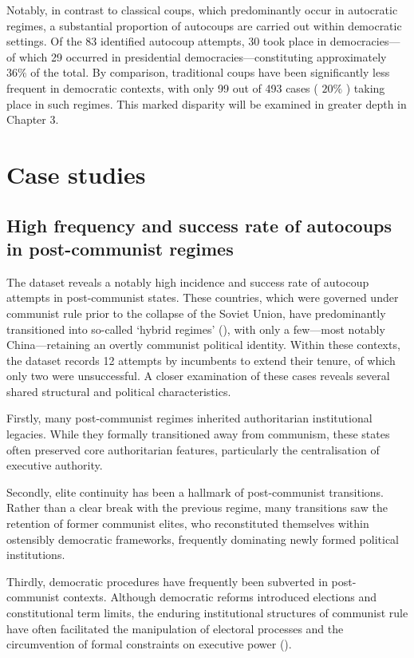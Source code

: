 \documentclass[
  12pt,
]{report}
\begin{document}
Notably, in contrast to classical coups, which predominantly occur in
autocratic regimes, a substantial proportion of autocoups are carried
out within democratic settings. Of the 83 identified autocoup attempts,
30 took place in democracies---of which 29 occurred in presidential
democracies---constituting approximately \(36\%\) of the total. By
comparison, traditional coups have been significantly less frequent in
democratic contexts, with only 99 out of 493 cases ( \(20\%\) ) taking
place in such regimes. This marked disparity will be examined in greater
depth in Chapter 3.

\section{Case studies}\label{case-studies}

\subsection{High frequency and success rate of autocoups in
post-communist
regimes}\label{high-frequency-and-success-rate-of-autocoups-in-post-communist-regimes}

The dataset reveals a notably high incidence and success rate of
autocoup attempts in post-communist states. These countries, which were
governed under communist rule prior to the collapse of the Soviet Union,
have predominantly transitioned into so-called `hybrid regimes'
(), with only a
few---most notably China---retaining an overtly communist political
identity. Within these contexts, the dataset records 12 attempts by
incumbents to extend their tenure, of which only two were unsuccessful.
A closer examination of these cases reveals several shared structural
and political characteristics.

Firstly, many post-communist regimes inherited authoritarian
institutional legacies. While they formally transitioned away from
communism, these states often preserved core authoritarian features,
particularly the centralisation of executive authority.

Secondly, elite continuity has been a hallmark of post-communist
transitions. Rather than a clear break with the previous regime, many
transitions saw the retention of former communist elites, who
reconstituted themselves within ostensibly democratic frameworks,
frequently dominating newly formed political institutions.

Thirdly, democratic procedures have frequently been subverted in
post-communist contexts. Although democratic reforms introduced
elections and constitutional term limits, the enduring institutional
structures of communist rule have often facilitated the manipulation of
electoral processes and the circumvention of formal constraints on
executive power ().
\end{document}
